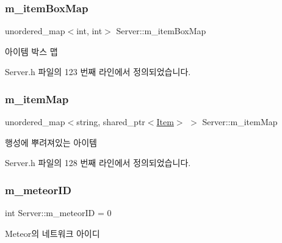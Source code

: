 \mbox{\label{class_server_a4212564accb77fd496f08ff3ec292657}} 
\subsubsection{\texorpdfstring{m\+\_\+item\+Box\+Map}{m\_itemBoxMap}}
{\footnotesize\ttfamily unordered\+\_\+map$<$int, int$>$ Server\+::m\+\_\+item\+Box\+Map\hspace{0.3cm}{\ttfamily [private]}}



아이템 박스 맵 



Server.\+h 파일의 123 번째 라인에서 정의되었습니다.

\mbox{\label{class_server_a892047fc49e676067b880f31d0d22c36}} 
\subsubsection{\texorpdfstring{m\+\_\+item\+Map}{m\_itemMap}}
{\footnotesize\ttfamily unordered\+\_\+map$<$string, shared\+\_\+ptr$<$\hyperlink{class_item}{Item}$>$ $>$ Server\+::m\+\_\+item\+Map\hspace{0.3cm}{\ttfamily [private]}}



행성에 뿌려져있는 아이템 



Server.\+h 파일의 128 번째 라인에서 정의되었습니다.

\mbox{\label{class_server_ab4f0de3a4d653f8b8631caf922643414}} 
\subsubsection{\texorpdfstring{m\+\_\+meteor\+ID}{m\_meteorID}}
{\footnotesize\ttfamily int Server\+::m\+\_\+meteor\+ID = 0\hspace{0.3cm}{\ttfamily [private]}}



Meteor의 네트워크 아이디 



